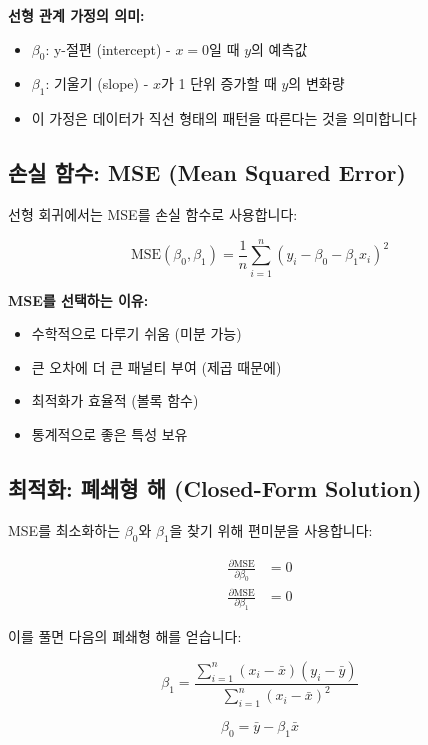 \documentclass[12pt]{article}
\begin{document}
\textbf{선형 관계 가정의 의미:}
\begin{itemize}
    \item $\beta_0$: y-절편 (intercept) - $x=0$일 때 $y$의 예측값
    \item $\beta_1$: 기울기 (slope) - $x$가 1 단위 증가할 때 $y$의 변화량
    \item 이 가정은 데이터가 직선 형태의 패턴을 따른다는 것을 의미합니다
\end{itemize}

\subsection{손실 함수: MSE (Mean Squared Error)}

선형 회귀에서는 MSE를 손실 함수로 사용합니다:

\begin{equation}
\text{MSE}(\beta_0, \beta_1) = \frac{1}{n}\sum_{i=1}^{n}(y_i - \beta_0 - \beta_1 x_i)^2
\end{equation}

\textbf{MSE를 선택하는 이유:}
\begin{itemize}
    \item 수학적으로 다루기 쉬움 (미분 가능)
    \item 큰 오차에 더 큰 패널티 부여 (제곱 때문에)
    \item 최적화가 효율적 (볼록 함수)
    \item 통계적으로 좋은 특성 보유
\end{itemize}

\subsection{최적화: 폐쇄형 해 (Closed-Form Solution)}

MSE를 최소화하는 $\beta_0$와 $\beta_1$을 찾기 위해 편미분을 사용합니다:

\begin{align}
\frac{\partial \text{MSE}}{\partial \beta_0} &= 0 \\
\frac{\partial \text{MSE}}{\partial \beta_1} &= 0
\end{align}

이를 풀면 다음의 폐쇄형 해를 얻습니다:

\begin{equation}
\beta_1 = \frac{\sum_{i=1}^{n}(x_i - \bar{x})(y_i - \bar{y})}{\sum_{i=1}^{n}(x_i - \bar{x})^2}
\end{equation}

\begin{equation}
\beta_0 = \bar{y} - \beta_1\bar{x}
\end{equation}
\end{document}
